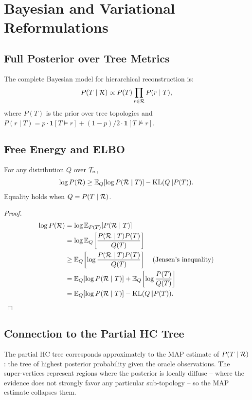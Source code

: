 \chapter{Bayesian and Variational Reformulations}
\label{app:variational}

\section{Full Posterior over Tree Metrics}

The complete Bayesian model for hierarchical reconstruction is:
\[
P(T \mid \mathcal{R}) \propto P(T) \prod_{r \in \mathcal{R}} P(r \mid T),
\]
where $P(T)$ is the prior over tree topologies and $P(r \mid T) = p \cdot \mathbf{1}[T \models r] + (1-p)/2 \cdot \mathbf{1}[T \not\models r]$.

\section{Free Energy and ELBO}

\begin{theorem}
For any distribution $Q$ over $\mathcal{T}_n$,
\[
\log P(\mathcal{R}) \geq \mathbb{E}_Q[\log P(\mathcal{R} \mid T)] - \mathrm{KL}(Q \| P(T)).
\]
Equality holds when $Q = P(T \mid \mathcal{R})$.
\end{theorem}

\begin{proof}
\begin{align*}
\log P(\mathcal{R}) &= \log \mathbb{E}_{P(T)}\!\left[P(\mathcal{R} \mid T)\right] \\
&= \log \mathbb{E}_{Q}\!\left[\frac{P(\mathcal{R} \mid T) P(T)}{Q(T)}\right] \\
&\geq \mathbb{E}_Q\!\left[\log \frac{P(\mathcal{R} \mid T) P(T)}{Q(T)}\right] \quad \text{(Jensen's inequality)} \\
&= \mathbb{E}_Q[\log P(\mathcal{R} \mid T)] + \mathbb{E}_Q\!\left[\log \frac{P(T)}{Q(T)}\right] \\
&= \mathbb{E}_Q[\log P(\mathcal{R} \mid T)] - \mathrm{KL}(Q \| P(T)).
\end{align*}
\end{proof}

\section{Connection to the Partial HC Tree}

The partial HC tree corresponds approximately to the MAP estimate of $P(T \mid \mathcal{R})$: the tree of highest posterior probability given the oracle observations. The super-vertices represent regions where the posterior is locally diffuse -- where the evidence does not strongly favor any particular sub-topology -- so the MAP estimate collapses them.

